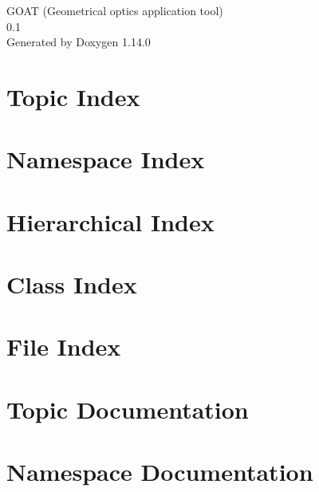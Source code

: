 \documentclass[twoside]{book}
\newcommand{\+}{\discretionary{\mbox{\scriptsize$\hookleftarrow$}}{}{}}
\newcommand{\clearemptydoublepage}{%
    \newpage{\pagestyle{empty}\cleardoublepage}%
  }
\begin{document}
  \raggedbottom
    \hypersetup{pageanchor=false,
                bookmarksnumbered=true,
                pdfencoding=unicode
               }
  \begin{titlepage}
  \vspace*{7cm}
  \begin{center}%
  {\Large GOAT (\+Geometrical optics application tool)}\\
  [1ex]\large 0.\+1 \\
  \vspace*{1cm}
  {\large Generated by Doxygen 1.14.0}\\
  \end{center}
  \end{titlepage}
  \clearemptydoublepage
  \tableofcontents
  \clearemptydoublepage
  \hypersetup{pageanchor=true}




\chapter{Topic Index}

\chapter{Namespace Index}

\chapter{Hierarchical Index}

\chapter{Class Index}

\chapter{File Index}

\chapter{Topic Documentation}

\chapter{Namespace Documentation}







\end{document}
